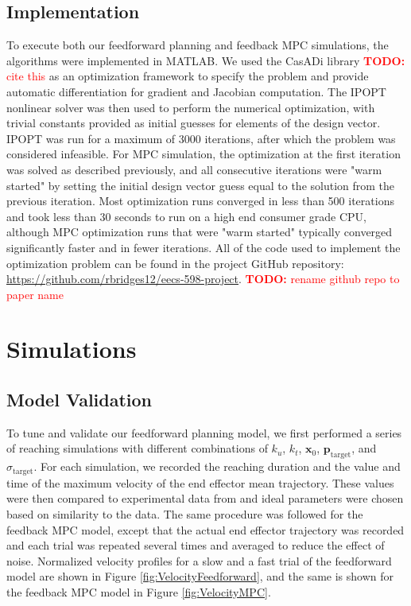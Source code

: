 \documentclass[letterpaper, 10pt, conference]{ieeeconf}
\newcommand{\todo}[1]{\textcolor{red}{\textbf{TODO:} #1}}
\begin{document}
\subsection{Implementation}
To execute both our feedforward planning and feedback MPC simulations, the algorithms were implemented in MATLAB. 
We used the CasADi library \todo{cite this} as an optimization framework to specify the problem and provide automatic differentiation for gradient and Jacobian computation. The IPOPT nonlinear solver was then used to perform the numerical optimization, with trivial constants provided as initial guesses for elements of the design vector. 
IPOPT was run for a maximum of 3000 iterations, after which the problem was considered infeasible. For MPC simulation, the optimization at the first iteration was solved as described previously, and all consecutive iterations were "warm started" by setting the initial design vector guess equal to the solution from the previous iteration. Most optimization runs converged in less than 500 iterations and took less than 30 seconds to run on a high end consumer grade CPU, although MPC optimization runs that were "warm started" typically converged significantly faster and in fewer iterations. All of the code used to implement the optimization problem can be found in the project GitHub repository: \href{https://github.com/rbridges12/eecs-598-project}{https://github.com/rbridges12/eecs-598-project}. \todo{rename github repo to paper name}

\section{Simulations}
\subsection{Model Validation}

To tune and validate our feedforward planning model, we first performed a series of reaching simulations with different combinations of $k_u$, $k_t$, $\mathbf{x}_0$, $\mathbf{p}_{\text{target}}$, and $\sigma_{\text{target}}$. For each simulation, we recorded the reaching duration and the value and time of the maximum velocity of the end effector mean trajectory. These values were then compared to experimental data from \cite{fitts_law_exp_data} and ideal parameters were chosen based on similarity to the data. The same procedure was followed for the feedback MPC model, except that the actual end effector trajectory was recorded and each trial was repeated several times and averaged to reduce the effect of noise.
Normalized velocity profiles for a slow and a fast trial of the feedforward model are shown in Figure \ref{fig:VelocityFeedforward}, and the same is shown for the feedback MPC model in Figure \ref{fig:VelocityMPC}.
\end{document}
